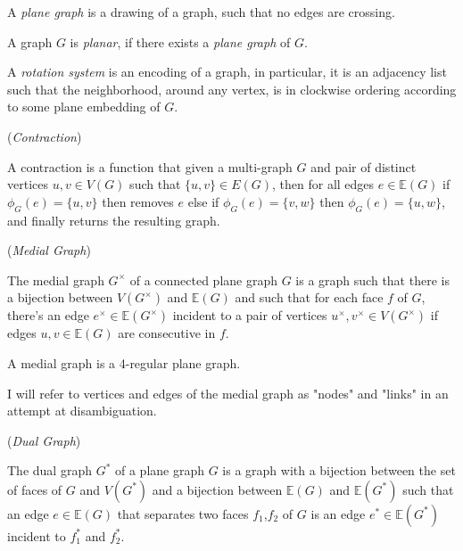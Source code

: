 \documentclass{article}
\begin{document}
	A \textit{plane graph} is a drawing of a graph, such that no edges are crossing.
	
	A graph $G$ is \textit{planar}, if there exists a \textit{plane graph} of $G$.

	A \textit{rotation system} is an encoding of a graph, in particular, it is an adjacency list such that the neighborhood, around any vertex, is in clockwise ordering according to some plane embedding of $G$.

	\begin{definition}\label{def:contraction}
		(\textit{Contraction})

		A contraction is a function that given a multi-graph $G$ and pair of distinct vertices $u,v \in V(G)$ such that $\{u,v\} \in E(G)$, then for all edges $e \in \mathbb{E}(G)$ if $\phi_G(e) = \{u,v\}$ then removes $e$ else if $\phi_G(e) = \{v,w\}$ then $\phi_G(e) = \{u,w\}$, and finally returns the resulting graph.
	\end{definition}

	\begin{center}
		
	\end{center}
	
	\begin{definition}\label{def:medial}
		(\textit{Medial Graph})
		
		The medial graph $G^\times$ of a connected plane graph $G$ is a graph such that there is a bijection between $V(G^\times)$ and $\mathbb{E}(G)$ and such that for each face $f$ of $G$, there's an edge $e^\times \in \mathbb{E}(G^\times)$ incident to a pair of vertices $u^\times,v^\times \in V(G^\times)$ if edges $u,v \in \mathbb{E}(G)$ are consecutive in $f$.
	\end{definition}

	\begin{center}
		
	\end{center}
	
	\begin{corollary}
		A medial graph is a 4-regular plane graph.
	\end{corollary}

	I will refer to vertices and edges of the medial graph as "nodes" and "links" in an attempt at disambiguation.

	\begin{definition}
		(\textit{Dual Graph})

		The dual graph $G^*$ of a plane graph $G$ is a graph with a bijection between the set of faces of $G$ and $V(G^*)$ and a bijection between $\mathbb{E}(G)$ and $\mathbb{E}(G^*)$ such that an edge $e \in \mathbb{E}(G)$ that separates two faces $f_1$,$f_2$ of $G$ is an edge $e^* \in \mathbb{E}(G^*)$ incident to $f_1^*$ and $f_2^*$.
	\end{definition}
\end{document}
